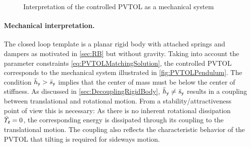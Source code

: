 \begin{figure}
 \centering
 
 \caption{Interpretation of the controlled PVTOL as a mechanical system} 
 \label{fig:PVTOLPendulum}
\end{figure}

\paragraph{Mechanical interpretation.}
The closed loop template is a planar rigid body with attached springs and dampers as motivated in \autoref{sec:RB} but without gravity.
Taking into account the parameter constraints \eqref{eq:PVTOLMatchingSolution}, the controlled PVTOL corresponds to the mechanical system illustrated in \autoref{fig:PVTOLPendulum}.
The condition $\bar{h}_{\mathsf{y}} > \bar{s}_{\mathsf{y}}$ implies that the center of mass must be below the center of stiffness.
As discussed in \autoref{sec:DecouplingRigidBody}, $\bar{h}_{\mathsf{y}} \neq \bar{s}_{\mathsf{y}}$ results in a coupling between translational and rotational motion.
From a stability/attractiveness point of view this is necessary: As there is no inherent rotational dissipation $\bar{\varUpsilon}_{\mathsf{z}} = 0$, the corresponding energy is dissipated through its coupling to the translational motion.
The coupling also reflects the characteristic behavior of the PVTOL that tilting is required for sideways motion.



